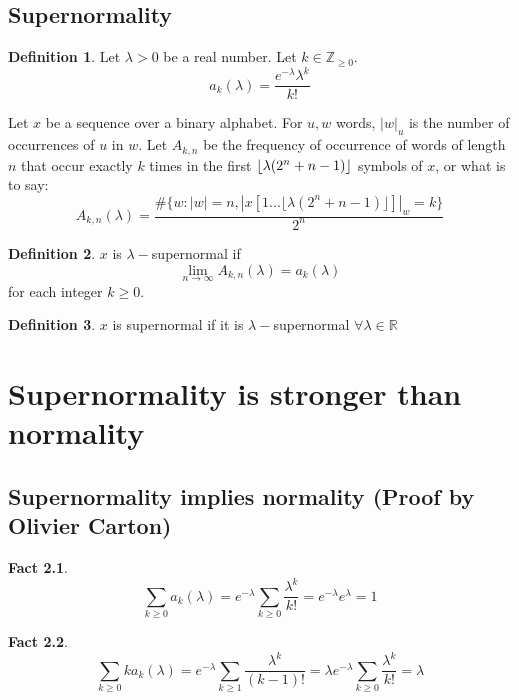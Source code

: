 \documentclass[11pt,a4paper]{tesis}
\newtheorem{fact}{Fact}[section]
\theoremstyle{definition}
\newtheorem{definition}{Definition}[section]
\DeclarePairedDelimiter{\floor}{\lfloor}{\rfloor}
\begin{document}
\section{Supernormality}

\begin{definition}
    Let $\lambda > 0$ be a real number. Let $k \in \mathds{Z}_{\ge 0}$.
    $$a_k(\lambda) = \frac{e^{-\lambda}\lambda^k}{k!}$$
\end{definition}

Let $x$ be a sequence over a binary alphabet.
For $u,w$ words, $|w|_u$ is the number of occurrences of $u$ in $w$.
Let $A_{k,n}$ be the frequency of occurrence of words of length $n$ that occur exactly $k$ times in the first $\floor{\lambda(2^n+n-1)}$ symbols of $x$, or what is to say:
$$A_{k,n}(\lambda) = \frac{\#\{w: |w| = n  , |x[1...\lfloor\lambda(2^n+n-1)\rfloor]|_w = k\}}{2^n}$$

\begin{definition}
    $x$ is $\lambda-$supernormal if $$\lim_{n\to\infty} A_{k,n}(\lambda) = a_k(\lambda)$$ for each integer $k \geq 0$.
\end{definition}

\begin{definition}
    $x$ is supernormal if it is $\lambda-$supernormal $\forall \lambda \in \mathds{R}$
\end{definition}

\chapter{Supernormality is stronger than normality}
\section{Supernormality implies normality (Proof by Olivier Carton)}



\begin{fact}
    $$\sum_{k \geq 0} a_k(\lambda) = e^{-\lambda}\sum_{k \geq 0} \frac{\lambda^k}{k!} = e^{-\lambda}e^{\lambda} = 1$$
\end{fact}

\begin{fact}
    $$\sum_{k \geq 0} ka_k(\lambda) = e^{-\lambda}\sum_{k \geq 1} \frac{\lambda^k}{(k-1)!} = \lambda e^{-\lambda} \sum_{k \geq 0} \frac{\lambda^k}{k!}= \lambda$$
\end{fact}
\end{document}
